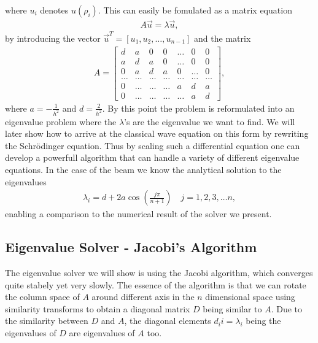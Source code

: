 \documentclass[twocolumn]{aastex62}
\begin{document}
where $u_i$ denotes $u(\rho_i)$. This can easily be fomulated as a matrix equation 
\begin{align}
	A\vec{u} = \lambda\vec{u},
	\label{eq:matrix_eq}
\end{align}
by introducing the vector $\vec{u}^T = [u_1, u_2, \ldots, u_{n-1}]$ and the matrix
\begin{align}
A = 
	\begin{bmatrix} 
	d& a & 0   & 0    & \dots  &0     & 0 \\
    a & d & a & 0    & \dots  &0     &0 \\
    0   & a & d & a  &0       &\dots & 0\\
    \dots  & \dots & \dots & \dots  &\dots      &\dots & \dots\\
    0   & \dots & \dots & \dots  &a  &d & a\\
   0   & \dots & \dots & \dots  &\dots       &a & d
    \end{bmatrix} ,
\end{align}
where $a = -\frac{1}{h^2}$ and $d = \frac{2}{h^2}$.
By this point the problem is reformulated into an eigenvalue problem where the $\lambda$'s are the eigenvalue we want to find. 
We will later show how to arrive at the classical wave equation on this form by rewriting the Schrödinger equation. Thus by scaling such a differential equation one can develop a powerfull algorithm that can handle a variety of different eigenvalue equations. In the case of the beam we know the analytical solution to the eigenvalues 
\begin{align}\label{eq:analyticaleig}
	\lambda_i = d + 2a \cos\left(\frac{j\pi}{n+1}\right)\quad j = 1, 2, 3, \ldots n,
\end{align}
enabling a comparison to the numerical result of the solver we present. 

\subsection{Eigenvalue Solver - Jacobi's Algorithm}
The eigenvalue solver we will show is using the Jacobi algorithm, which converges quite stabely yet very slowly. The essence of the algorithm is that we can rotate the column space of $A$ around different axis in the $n$ dimensional space using similarity transforms to obtain a diagonal matrix $D$ being similar to $A$. Due to the similarity between $D$ and $A$, the diagonal elements $d_ii = \lambda_i$ being the eigenvalues of $D$ are eigenvalues of $A$ too.
\end{document}
